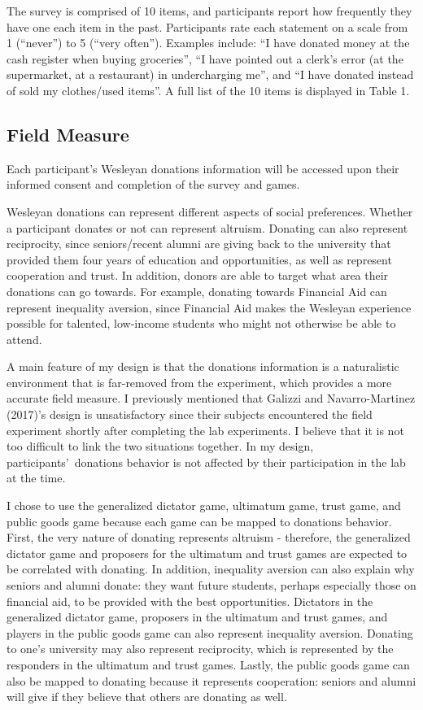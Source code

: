 \documentclass[12pt]{article}
\begin{document}
The survey is comprised of 10 items, and participants report how frequently they have one each item in the past. Participants rate each statement on a scale from 1 (``never'') to 5 (``very often''). Examples include: ``I have donated money at the cash register when buying groceries'', ``I have pointed out a clerk\rq s error (at the supermarket, at a restaurant) in undercharging me'', and ``I have donated instead of sold my clothes/used items''. A full list of the 10 items is displayed in Table 1. 

\subsection{Field Measure}

Each participant\rq s Wesleyan donations information will be accessed upon their informed consent and completion of the survey and games. 

Wesleyan donations can represent different aspects of social preferences. Whether a participant donates or not can represent altruism. Donating can also represent reciprocity, since seniors/recent alumni are giving back to the university that provided them four years of education and opportunities, as well as represent cooperation and trust. In addition, donors are able to target what area their donations can go towards. For example, donating towards Financial Aid can represent inequality aversion, since Financial Aid makes the Wesleyan experience possible for talented, low-income students who might not otherwise be able to attend.  

A main feature of my design is that the donations information is a naturalistic environment that is far-removed from the experiment, which provides a more accurate field measure. I previously mentioned that Galizzi and Navarro-Martinez (2017)\rq s design is unsatisfactory since their subjects encountered the field experiment shortly after completing the lab experiments. I believe that it is not too difficult to link the two situations together. In my design, participants\rq \ donations behavior is not affected by their participation in the lab at the time. 

I chose to use the generalized dictator game, ultimatum game, trust game, and public goods game because each game can be mapped to donations behavior. First, the very nature of donating represents altruism - therefore, the generalized dictator game and proposers for the ultimatum and trust games are expected to be correlated with donating. In addition, inequality aversion can also explain why seniors and alumni donate: they want future students, perhaps especially those on financial aid, to be provided with the best opportunities. Dictators in the generalized dictator game, proposers in the ultimatum and trust games, and players in the public goods game can also represent inequality aversion.  Donating to one's university may also represent reciprocity, which is represented by the responders in the ultimatum and trust games. Lastly, the public goods game can also be mapped to donating because it represents cooperation: seniors and alumni will give if they believe that others are donating as well. 
	
\end{document}
